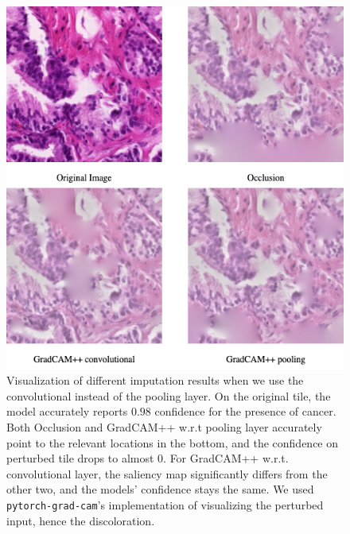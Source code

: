 \begin{figure}
    \begin{center}
    \begin{minipage}{0.75\textwidth}
      \includegraphics[width=\textwidth]{img/gradcampp-road-conv-vs-pool.png}
    \end{minipage}
    \caption{Visualization of different imputation results when we use the convolutional instead of the pooling layer. On the original tile, the model accurately reports $0.98$ confidence for the presence of cancer. Both Occlusion and GradCAM++ w.r.t pooling layer accurately point to the relevant locations in the bottom, and the confidence on perturbed tile drops to almost $0$. For GradCAM++ w.r.t. convolutional layer, the saliency map significantly differs from the other two, and the models' confidence stays the same. We used \texttt{pytorch-grad-cam}'s implementation of visualizing the perturbed input, hence the discoloration.}
    \label{fig:gradcampp-road-conv-vs-pool}
    \end{center}
\end{figure}